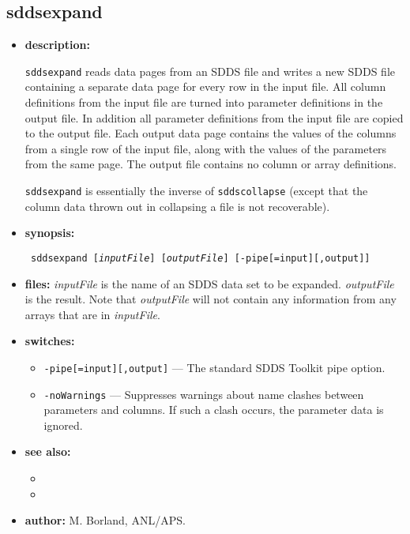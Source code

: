 \begin{latexonly}
\newpage
\end{latexonly}
\subsection{sddsexpand}
\label{sddsexpand}

\begin{itemize}
\item {\bf description:}

\verb|sddsexpand| reads data pages from an SDDS file and writes a new
SDDS file containing a separate data page for every row in the input
file.  All column definitions from the input file are turned into
parameter definitions in the output file.  In addition all parameter
definitions from the input file are copied to the output file.  Each
output data page contains the values of the columns from a single row
of the input file, along with the values of the parameters from the
same page.  The output file contains no column or array definitions.

\verb|sddsexpand| is essentially the inverse of \verb|sddscollapse|
(except that the column data thrown out in collapsing a file is not
recoverable).

\item {\bf synopsis:} 
\begin{flushleft}{\tt
sddsexpand [{\em inputFile}] [{\em outputFile}] [-pipe[=input][,output]]
}\end{flushleft}

\item {\bf files:} {\em inputFile} is the name of an SDDS data set to
be expanded.  {\em outputFile} is the result.  Note that {\em
outputFile} will not contain any information from any arrays that are
in {\em inputFile}.

\item {\bf switches:} 
\begin{itemize}
        \item {\tt -pipe[=input][,output]} --- The standard SDDS Toolkit pipe option.
        \item {\tt -noWarnings} --- Suppresses warnings about name clashes between
        parameters and columns.  If such a clash occurs, the parameter data is ignored.
\end{itemize}

\item {\bf see also:}
    \begin{itemize}
    \item {}
    \item {}
    \end{itemize}
\item {\bf author:} M. Borland, ANL/APS.
\end{itemize}



